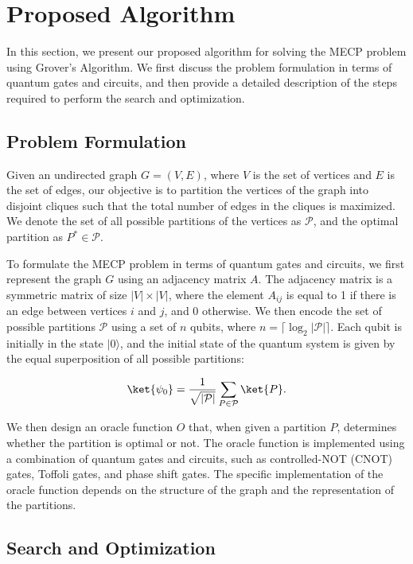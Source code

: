 \section{Proposed Algorithm} \label{sec:proposed_algorithm}

In this section, we present our proposed algorithm for solving the MECP problem using Grover's Algorithm. We first discuss the problem formulation in terms of quantum gates and circuits, and then provide a detailed description of the steps required to perform the search and optimization.

\subsection{Problem Formulation}

Given an undirected graph $G = (V, E)$, where $V$ is the set of vertices and $E$ is the set of edges, our objective is to partition the vertices of the graph into disjoint cliques such that the total number of edges in the cliques is maximized. We denote the set of all possible partitions of the vertices as $\mathcal{P}$, and the optimal partition as $P^* \in \mathcal{P}$.

To formulate the MECP problem in terms of quantum gates and circuits, we first represent the graph $G$ using an adjacency matrix $A$. The adjacency matrix is a symmetric matrix of size $|V| \times |V|$, where the element $A_{ij}$ is equal to 1 if there is an edge between vertices $i$ and $j$, and 0 otherwise. We then encode the set of possible partitions $\mathcal{P}$ using a set of $n$ qubits, where $n = \lceil \log_2 |\mathcal{P}| \rceil$. Each qubit is initially in the state $|0\rangle$, and the initial state of the quantum system is given by the equal superposition of all possible partitions:

\begin{equation}
\ket{\psi_0} = \frac{1}{\sqrt{|\mathcal{P}|}} \sum_{P \in \mathcal{P}} \ket{P}.
\end{equation}

We then design an oracle function $O$ that, when given a partition $P$, determines whether the partition is optimal or not. The oracle function is implemented using a combination of quantum gates and circuits, such as controlled-NOT (CNOT) gates, Toffoli gates, and phase shift gates. The specific implementation of the oracle function depends on the structure of the graph and the representation of the partitions.

\subsection{Search and Optimization}

